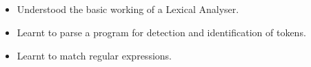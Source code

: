 \documentclass[12pt,letterpaper]{article}
\begin{document}
\subsection*{}
\begin{flushleft}
    \renewcommand{\labelitemi}{$\textendash$}
    \begin{itemize}
        \item Understood the basic working of a Lexical Analyser.
        \item Learnt to parse a program for detection and identification of tokens.
        \item Learnt to match regular expressions.
    \end{itemize}
\end{flushleft}
\end{document}
